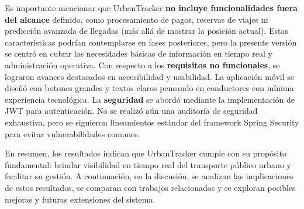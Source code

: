 Es importante mencionar que UrbanTracker \textbf{no incluye funcionalidades fuera del alcance} definido, como procesamiento de pagos, reservas de viajes ni predicción avanzada de llegadas (más allá de mostrar la posición actual). Estas características podrían contemplarse en fases posteriores, pero la presente versión se centró en cubrir las necesidades básicas de información en tiempo real y administración operativa. Con respecto a los \textbf{requisitos no funcionales}, se lograron avances destacados en accesibilidad y usabilidad. La aplicación móvil se diseñó con botones grandes y textos claros pensando en conductores con mínima experiencia tecnológica. La \textbf{seguridad} se abordó mediante la implementación de JWT para autenticación. No se realizó aún una auditoría de seguridad exhaustiva, pero se siguieron lineamientos estándar del framework Spring Security para evitar vulnerabilidades comunes.

En resumen, los resultados indican que UrbanTracker cumple con su propósito fundamental: brindar visibilidad en tiempo real del transporte público urbano y facilitar su gestión. A continuación, en la discusión, se analizan las implicaciones de estos resultados, se comparan con trabajos relacionados y se exploran posibles mejoras y futuras extensiones del sistema.

